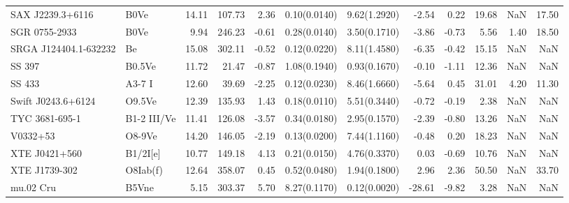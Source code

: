 \begin{longtable}{llrrrllrrrrr}
SAX J2239.3+6116 & B0Ve & 14.11 & 107.73 & 2.36 & 0.10(0.0140) & 9.62(1.2920) & -2.54 & 0.22 & 19.68 & NaN & 17.50 \\
SGR 0755-2933 & B0Ve & 9.94 & 246.23 & -0.61 & 0.28(0.0140) & 3.50(0.1710) & -3.86 & -0.73 & 5.56 & 1.40 & 18.50 \\
SRGA J124404.1-632232 & Be & 15.08 & 302.11 & -0.52 & 0.12(0.0220) & 8.11(1.4580) & -6.35 & -0.42 & 15.15 & NaN & NaN \\
SS 397 & B0.5Ve & 11.72 & 21.47 & -0.87 & 1.08(0.1940) & 0.93(0.1670) & -0.10 & -1.11 & 12.36 & NaN & NaN \\
SS 433 & A3-7 I & 12.60 & 39.69 & -2.25 & 0.12(0.0230) & 8.46(1.6660) & -5.64 & 0.45 & 31.01 & 4.20 & 11.30 \\
Swift J0243.6+6124 & O9.5Ve & 12.39 & 135.93 & 1.43 & 0.18(0.0110) & 5.51(0.3440) & -0.72 & -0.19 & 2.38 & NaN & NaN \\
TYC 3681-695-1 & B1-2 III/Ve & 11.41 & 126.08 & -3.57 & 0.34(0.0180) & 2.95(0.1570) & -2.39 & -0.80 & 13.26 & NaN & NaN \\
V0332+53 & O8-9Ve & 14.20 & 146.05 & -2.19 & 0.13(0.0200) & 7.44(1.1160) & -0.48 & 0.20 & 18.23 & NaN & NaN \\
XTE J0421+560 & B1/2I[e] & 10.77 & 149.18 & 4.13 & 0.21(0.0150) & 4.76(0.3370) & 0.03 & -0.69 & 10.76 & NaN & NaN \\
XTE J1739-302 & O8Iab(f) & 12.64 & 358.07 & 0.45 & 0.52(0.0480) & 1.94(0.1800) & 2.96 & 2.36 & 50.50 & NaN & 33.70 \\
mu.02 Cru & B5Vne & 5.15 & 303.37 & 5.70 & 8.27(0.1170) & 0.12(0.0020) & -28.61 & -9.82 & 3.28 & NaN & NaN \\
\end{longtable}
